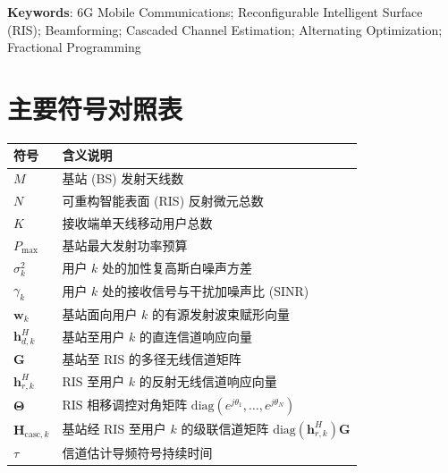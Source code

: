 \documentclass[12pt,a4paper,openany,UTF8]{ctexrep}
\begin{document}
\vspace{0.6cm}
\noindent \textbf{Keywords}: 6G Mobile Communications; Reconfigurable Intelligent Surface (RIS); Beamforming; Cascaded Channel Estimation; Alternating Optimization; Fractional Programming

\newpage

\tableofcontents
\newpage

\listoffigures
\newpage
\listoftables
\newpage

\chapter*{主要符号对照表}
\begin{center}
\begin{tabular}{ll}
  \toprule
  \textbf{符号} & \textbf{含义说明} \\
  \midrule
  $M$ & 基站 (BS) 发射天线数 \\
  $N$ & 可重构智能表面 (RIS) 反射微元总数 \\
  $K$ & 接收端单天线移动用户总数 \\
  $P_{\max}$ & 基站最大发射功率预算 \\
  $\sigma_k^2$ & 用户 $k$ 处的加性复高斯白噪声方差 \\
  $\gamma_k$ & 用户 $k$ 处的接收信号与干扰加噪声比 (SINR) \\
  $\bm{w}_k$ & 基站面向用户 $k$ 的有源发射波束赋形向量 \\
  $\bm{h}_{d,k}^H$ & 基站至用户 $k$ 的直连信道响应向量 \\
  $\bm{G}$ & 基站至 RIS 的多径无线信道矩阵 \\
  $\bm{h}_{r,k}^H$ & RIS 至用户 $k$ 的反射无线信道响应向量 \\
  $\bm{\Theta}$ & RIS 相移调控对角矩阵 $\mathrm{diag}(e^{j\theta_1}, \dots, e^{j\theta_N})$ \\
  $\bm{H}_{\mathrm{casc},k}$ & 基站经 RIS 至用户 $k$ 的级联信道矩阵 $\mathrm{diag}(\bm{h}_{r,k}^H)\bm{G}$ \\
  $\tau$ & 信道估计导频符号持续时间 \\
  \bottomrule
\end{tabular}
\end{center}
\newpage

\setcounter{page}{1}






\end{document}
